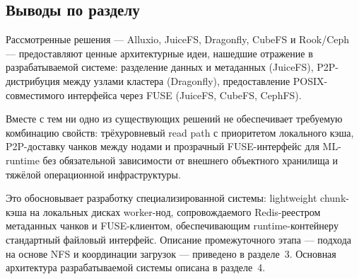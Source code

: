 \subsection{Выводы по разделу}

Рассмотренные решения --- Alluxio, JuiceFS, Dragonfly, CubeFS и Rook/Ceph --- предоставляют ценные архитектурные идеи, нашедшие отражение в разрабатываемой системе: разделение данных и метаданных (JuiceFS), P2P-дистрибуция между узлами кластера (Dragonfly), предоставление POSIX-совместимого интерфейса через FUSE (JuiceFS, CubeFS, CephFS).

Вместе с тем ни одно из существующих решений не обеспечивает требуемую комбинацию свойств: трёхуровневый read path с приоритетом локального кэша, P2P-доставку чанков между нодами и прозрачный FUSE-интерфейс для ML-runtime без обязательной зависимости от внешнего объектного хранилища и тяжёлой операционной инфраструктуры.

Это обосновывает разработку специализированной системы: lightweight chunk-кэша на локальных дисках worker-нод, сопровождаемого Redis-реестром метаданных чанков и FUSE-клиентом, обеспечивающим runtime-контейнеру стандартный файловый интерфейс. Описание промежуточного этапа --- подхода на основе NFS и координации загрузок --- приведено в разделе~3. Основная архитектура разрабатываемой системы описана в разделе~4.
